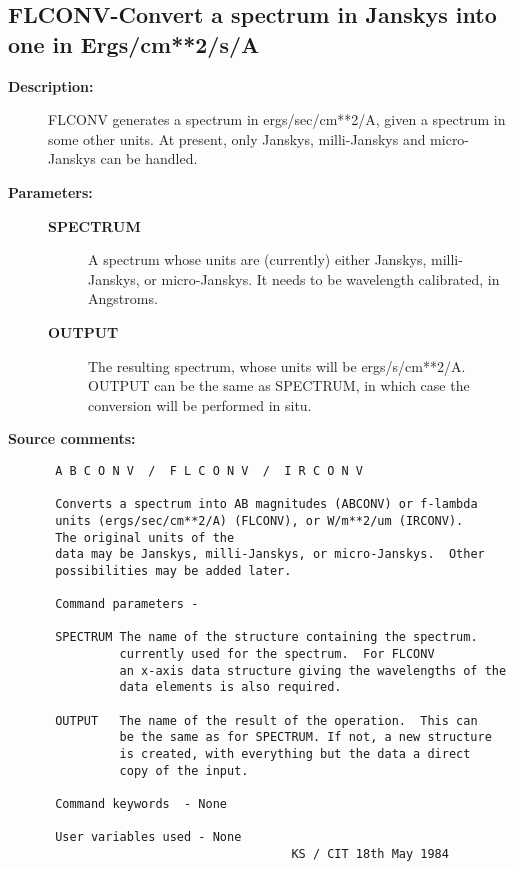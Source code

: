 \subsection{FLCONV-\label{FLCONV}Convert a spectrum in Janskys into one in Ergs/cm**2/s/A}
\begin{description}

\item [{\bf Description:}]
 FLCONV generates a spectrum in ergs/sec/cm**2/A, given a spectrum
 in some other units.  At present, only Janskys, milli-Janskys and
 micro-Janskys can be handled.

\item [{\bf Parameters:}]
\begin{description}
\item [{\bf SPECTRUM}]
 A spectrum whose units are (currently) either
 Janskys, milli-Janskys, or micro-Janskys.  It
 needs to be wavelength calibrated, in Angstroms.
\item [{\bf OUTPUT}]
 The resulting spectrum, whose units will be ergs/s/cm**2/A.
 OUTPUT can be the same as SPECTRUM, in which case the
 conversion will be performed in situ.
\end{description}

\item [{\bf Source comments:}]
\begin{verbatim}
 A B C O N V  /  F L C O N V  /  I R C O N V

 Converts a spectrum into AB magnitudes (ABCONV) or f-lambda
 units (ergs/sec/cm**2/A) (FLCONV), or W/m**2/um (IRCONV).
 The original units of the
 data may be Janskys, milli-Janskys, or micro-Janskys.  Other
 possibilities may be added later.

 Command parameters -

 SPECTRUM The name of the structure containing the spectrum.
          currently used for the spectrum.  For FLCONV
          an x-axis data structure giving the wavelengths of the
          data elements is also required.

 OUTPUT   The name of the result of the operation.  This can
          be the same as for SPECTRUM. If not, a new structure
          is created, with everything but the data a direct
          copy of the input.

 Command keywords  - None

 User variables used - None
                                  KS / CIT 18th May 1984
\end{verbatim}
\end{description}
